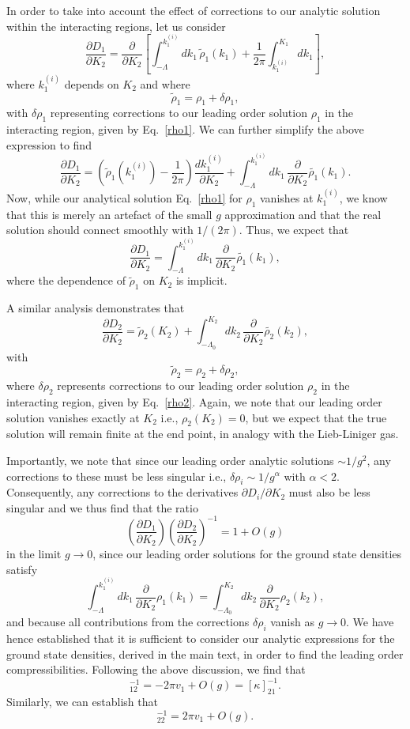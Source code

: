\documentclass[aps,pra,
superscriptaddress,
reprint,twocolumn,preprintnumbers,
amsmath,amssymb,
nofootinbib]{revtex4-1}
\newcommand{\beq}{\begin{equation}}
\newcommand{\eeq}{\end{equation}}
\newcommand{\p}{\partial}
\begin{document}
In order to take into account the effect of corrections to our analytic solution within the interacting regions, let us consider 
\beq
\frac{\p D_1}{\p K_2} = \frac{\p}{\p K_2} \left[\int_{-\Lambda}^{k_1^{(i)}}dk_1\,\tilde{\rho}_1(k_1) + \frac{1}{2 \pi} \int_{k_1^{(i)}}^{K_1} dk_1\right],
\eeq	
where $k_1^{(i)}$ depends on $K_2$ and where 
\beq
\tilde{\rho}_1 = \rho_1 + \delta \rho_1,
\eeq
with $\delta \rho_1$ representing corrections to our leading order solution $\rho_1$ in the interacting region, given by Eq.~\eqref{rho1}. We can further simplify the above expression to find 
\beq
\frac{\p D_1}{\p K_2} = \left(\tilde{\rho}_1(k_1^{(i)}) - \frac{1}{2\pi} \right) \frac{d k_1^{(i)}}{\p K_2} + \int_{-\Lambda}^{k_1^{(i)}} dk_1\, \frac{\p}{\p K_2}\tilde{\rho_1}(k_1).
\eeq
Now, while our analytical solution Eq.~\eqref{rho1} for $\rho_1$ vanishes at $k_1^{(i)}$, we know that this is merely an artefact of the small $g$ approximation and that the real solution should connect smoothly with $1/(2\pi)$. Thus, we expect that
\beq
\frac{\p D_1}{\p K_2} = \int_{-\Lambda}^{k_1^{(i)}} dk_1\, \frac{\p}{\p K_2}\tilde{\rho_1}(k_1),
\eeq
where the dependence of $\tilde{\rho}_1$ on $K_2$ is implicit. 

A similar analysis demonstrates that
\beq
\frac{\p D_2}{\p K_2} = \tilde{\rho}_2(K_2) + \int_{-\Lambda_0}^{K_2} dk_2\, \frac{\p}{\p K_2}\tilde{\rho_2}(k_2),
\eeq	
with 
\beq
\tilde{\rho}_2 = \rho_2 + \delta \rho_2,
\eeq
where $\delta \rho_2$ represents corrections to our leading order solution $\rho_2$ in the interacting region, given by Eq.~\eqref{rho2}. Again, we note that our leading order solution vanishes exactly at $K_2$ i.e., $\rho_2(K_2) = 0$, but we expect that the true solution will remain finite at the end point, in analogy with the Lieb-Liniger gas. 
	
Importantly, we note that since our leading order analytic solutions $\sim 1/g^2$, any corrections to these must be less singular i.e., $\delta \rho_i \sim 1/g^\alpha$ with $\alpha<2$. Consequently, any corrections to the derivatives $\p D_i/\p K_2$ must also be less singular and we thus find that the ratio 
\beq
\left( \frac{\p D_1}{\p K_2}\right) \left(\frac{\p D_2}{\p K_2} \right)^{-1} = 1 + O(g)
\eeq
in the limit $g \to 0$, since our leading order solutions for the ground state densities satisfy
\beq
\int_{-\Lambda}^{k_1^{(i)}} dk_1\, \frac{\p}{\p K_2}\rho_1(k_1) = \int_{-\Lambda_0}^{K_2} dk_2\, \frac{\p}{\p K_2}\rho_2(k_2),
\eeq
and because all contributions from the corrections $\delta \rho_i$ vanish as $g\to 0$. We have hence established that it is sufficient to consider our analytic expressions for the ground state densities, derived in the main text, in order to find the leading order compressibilities. Following the above discussion, we find that 
\beq
[\kappa]_{12}^{-1} = -2 \pi v_1 + O(g) = [\kappa]_{21}^{-1}.
\eeq
Similarly, we can establish that
\beq
[\kappa]_{22}^{-1} = 2 \pi v_1 + O(g).
\eeq
\end{document}
